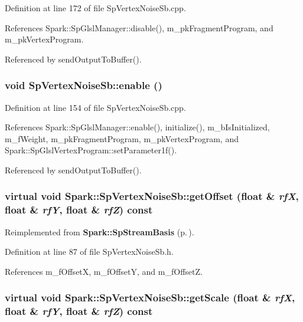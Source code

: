 Definition at line 172 of file Sp\-Vertex\-Noise\-Sb.cpp.

References Spark::Sp\-Glsl\-Manager::disable(), m\_\-pk\-Fragment\-Program, and m\_\-pk\-Vertex\-Program.

Referenced by send\-Output\-To\-Buffer().
\subsubsection{\setlength{\rightskip}{0pt plus 5cm}void Sp\-Vertex\-Noise\-Sb::enable ()}\label{classSpark_1_1SpVertexNoiseSb_a5}


Definition at line 154 of file Sp\-Vertex\-Noise\-Sb.cpp.

References Spark::Sp\-Glsl\-Manager::enable(), initialize(), m\_\-b\-Is\-Initialized, m\_\-f\-Weight, m\_\-pk\-Fragment\-Program, m\_\-pk\-Vertex\-Program, and Spark::Sp\-Glsl\-Vertex\-Program::set\-Parameter1f().

Referenced by send\-Output\-To\-Buffer().
\subsubsection{\setlength{\rightskip}{0pt plus 5cm}virtual void Spark::Sp\-Vertex\-Noise\-Sb::get\-Offset (float \& {\em rf\-X}, float \& {\em rf\-Y}, float \& {\em rf\-Z}) const\hspace{0.3cm}{\tt  [inline, virtual]}}\label{classSpark_1_1SpVertexNoiseSb_a10}




Reimplemented from {\bf Spark::Sp\-Stream\-Basis} {\rm (p.\,\pageref{classSpark_1_1SpStreamBasis_a7})}.

Definition at line 87 of file Sp\-Vertex\-Noise\-Sb.h.

References m\_\-f\-Offset\-X, m\_\-f\-Offset\-Y, and m\_\-f\-Offset\-Z.
\subsubsection{\setlength{\rightskip}{0pt plus 5cm}virtual void Spark::Sp\-Vertex\-Noise\-Sb::get\-Scale (float \& {\em rf\-X}, float \& {\em rf\-Y}, float \& {\em rf\-Z}) const\hspace{0.3cm}{\tt  [inline, virtual]}}\label{classSpark_1_1SpVertexNoiseSb_a8}




